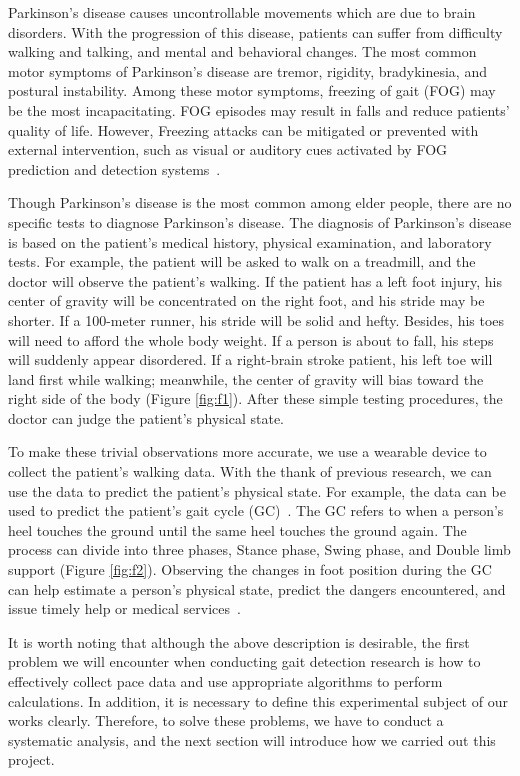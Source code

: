 \documentclass[10pt,twocolumn,letterpaper]{article}
\begin{document}
Parkinson’s disease causes uncontrollable movements which are due to brain disorders. With the progression of this disease, patients can suffer from difficulty walking and talking, and mental and behavioral changes. The most common motor symptoms of Parkinson’s disease are tremor, rigidity, bradykinesia, and postural instability. Among these motor symptoms, freezing of gait (FOG) may be the most incapacitating. FOG episodes may result in falls and reduce patients’ quality of life. However, Freezing attacks can be mitigated or prevented with external intervention, such as visual or auditory cues activated by FOG prediction and detection systems~\cite{10.1016/j.jneurol.2019.01.003}.

Though Parkinson’s disease is the most common among elder people, there are no specific tests to diagnose Parkinson’s disease. The diagnosis of Parkinson’s disease is based on the patient’s medical history, physical examination, and laboratory tests. For example, the patient will be asked to walk on a treadmill, and the doctor will observe the patient’s walking. If the patient has a left foot injury, his center of gravity will be concentrated on the right foot, and his stride may be shorter. If a 100-meter runner, his stride will be solid and hefty. Besides, his toes will need to afford the whole body weight. If a person is about to fall, his steps will suddenly appear disordered. If a right-brain stroke patient, his left toe will land first while walking; meanwhile, the center of gravity will bias toward the right side of the body (Figure \ref{fig:f1}). After these simple testing procedures, the doctor can judge the patient's physical state.

To make these trivial observations more accurate, we use a wearable device to collect the patient's walking data. With the thank of previous research, we can use the data to predict the patient's physical state. For example, the data can be used to predict the patient's gait cycle (GC)~\cite{8540355, gcdef2011}. The GC refers to when a person's heel touches the ground until the same heel touches the ground again. The process can divide into three phases, Stance phase, Swing phase, and Double limb support (Figure \ref{fig:f2}). Observing the changes in foot position during the GC can help estimate a person's physical state, predict the dangers encountered, and issue timely help or medical services~\cite{CAMPS2018119}.

It is worth noting that although the above description is desirable, the first problem we will encounter when conducting gait detection research is how to effectively collect pace data and use appropriate algorithms to perform calculations. In addition, it is necessary to define this experimental subject of our works clearly. Therefore, to solve these problems, we have to conduct a systematic analysis, and the next section will introduce how we carried out this project.
\end{document}
